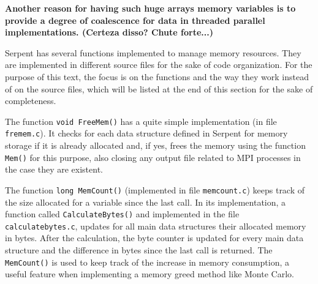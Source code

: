 \documentclass[twoside,a4paper,12pt,english,draft]{anstrans}
\begin{document}
\textbf{Another reason for having such huge arrays memory variables is to
provide a degree of coalescence for data in threaded parallel implementations.
(Certeza disso? Chute forte...)}

%

Serpent has several functions implemented to manage memory resources. They are implemented in different
source files for the sake of code organization. For the purpose of this text, the focus is on the functions
and the way they work instead of on the source files, which will be listed at the end of this section for
the sake of completeness.

The function \texttt{void FreeMem()} has a quite simple implementation (in file \texttt{fremem.c}). It checks for each data structure
defined in Serpent for memory storage if it is already allocated and, if yes, frees the memory using
the function \texttt{Mem()} for this purpose, also closing any output file related to MPI processes
in the case they are existent.

The function \texttt{long MemCount()} (implemented in file \texttt{memcount.c}) keeps track
of the size allocated for a variable since the last
call. In its implementation, a function called \texttt{CalculateBytes()} and implemented in the file
\texttt{calculatebytes.c}, updates for all main data structures their allocated memory in bytes.
After the calculation, the byte counter is updated for every main data structure and the difference
in bytes since the last call is returned. The \texttt{MemCount()} is used to keep track of the increase
in memory consumption, a useful feature when implementing a memory greed method like Monte Carlo.

  
\end{document}

